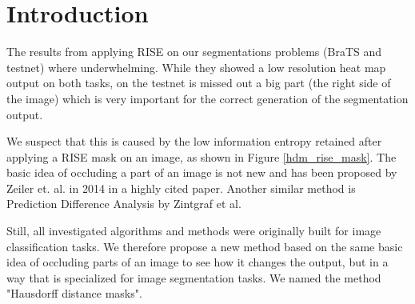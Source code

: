 \section{Introduction}

The results from applying RISE on our segmentations problems (BraTS and testnet) where underwhelming. While they showed a low resolution heat map output on both tasks,
on the testnet is missed out a big part (the right side of the image) which is very important for the correct generation of the segmentation output.

We suspect that this is caused by the low information entropy retained after applying a RISE mask on an image, as shown in Figure \ref{hdm_rise_mask}.
The basic idea of occluding a part of an image is not new and has been proposed by Zeiler et. al. in 2014 \cite{zeiler2014visualizing} in a highly cited paper.
Another similar method is Prediction Difference Analysis \cite{zintgraf2017visualizing} by Zintgraf et al.

Still, all investigated algorithms and methods were originally built for image classification tasks. We therefore propose a new method based on the same basic idea
of occluding parts of an image to see how it changes the output, but in a way that is specialized for image segmentation tasks. We named the method "Hausdorff distance masks".

